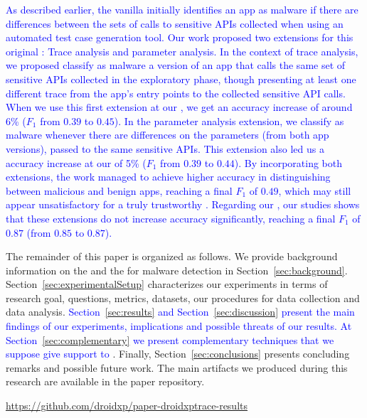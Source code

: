 %


\textcolor{blue}{As described earlier, the vanilla \mas initially identifies an app as malware if there are differences between the sets of calls to sensitive APIs collected when using an automated test case generation tool. Our work proposed two extensions for this original \mas: Trace analysis and parameter analysis. In the context of trace analysis, we proposed classify as malware a version of an app that calls the same set of sensitive APIs collected in the exploratory phase, though presenting at least one different trace from the app's entry points to the collected sensitive API calls. When we use this first extension at our \cds, we get an accuracy increase of around 6\% ($F_1$ from $0.39$ to $0.45$). In the parameter analysis extension, we classify as malware whenever there are differences on the parameters (from both app versions), passed to the same sensitive APIs. This extension also led us a accuracy increase at our \cds of 5\% ($F_1$ from $0.39$ to $0.44$). By incorporating both extensions, the work managed to achieve higher accuracy in distinguishing between malicious and benign apps, reaching a final $F_1$ of $0.49$, which may still appear unsatisfactory for a truly trustworthy \mas. Regarding our \nds, our studies shows that these extensions do not increase accuracy significantly, reaching a final $F_1$ of $0.87$ (from $0.85$ to $0.87$).}

The remainder of this paper is organized as follows. 
We provide background information on the \mas and the \mas for malware detection in
Section~\ref{sec:background}. Section~\ref{sec:experimentalSetup}
characterizes our experiments in terms of research goal, questions, metrics, datasets, our procedures for data collection and data analysis. \textcolor{blue}{Section~\ref{sec:results} and Section~\ref{sec:discussion} present the main findings of our experiments, implications and possible threats of our results. At Section~\ref{sec:complementary} we present complementary techniques that we suppose give support to \mas}. Finally,
Section~\ref{sec:conclusions} presents concluding remarks and possible future
work. The main artifacts we produced during this research are available in the
paper repository.

\begin{small}
  \begin{center}
    \url{https://github.com/droidxp/paper-droidxptrace-results}
  \end{center}
\end{small}
